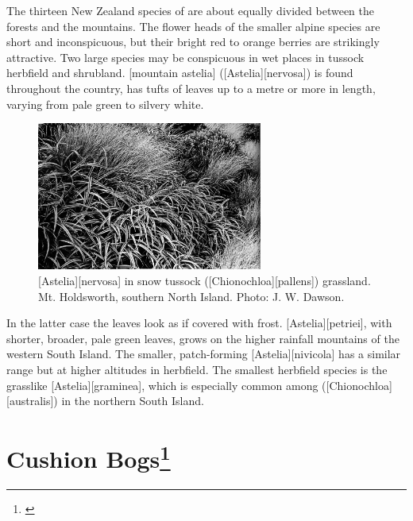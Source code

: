 The thirteen New Zealand species of  are about equally divided between the forests and the mountains.
The flower heads of the smaller alpine species are short and inconspicuous, but their bright red to orange berries are strikingly attractive.
Two large species may be conspicuous in wet places in tussock herbfield and shrubland.
[mountain astelia] ([Astelia][nervosa]) is found throughout the country, has tufts of leaves up to a metre or more in length, varying from pale green to silvery white.
\begin{figure}
	\includegraphics[width=0.66\textwidth]{graphics/figure103astelia.jpg}
	\centering
	\caption[\emph{Astelia nervosa} in snow tussock]{[Astelia][nervosa] in snow tussock ([Chionochloa][pallens]) grassland.
	Mt. Holdsworth, southern North Island.
	Photo: J. W. Dawson.}%
	\label{fig:103astelia}
\end{figure}
In the latter case the leaves look as if covered with frost. [Astelia][petriei], with shorter, broader, pale green leaves, grows on the higher rainfall mountains of the western South Island.
The smaller, patch-forming [Astelia][nivicola] has a similar range but at higher altitudes in herbfield.
The smallest herbfield species is the grasslike [Astelia][graminea], which is especially common among  ([Chionochloa][australis]) in the northern South Island.

\section[Cushion Bogs]{Cushion Bogs\thinspace\footnote{\cite{gibson1985comparison}}}

